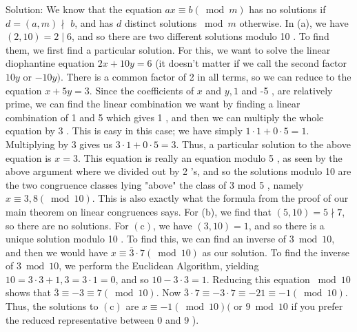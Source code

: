 \begin{enumerate}
  Solution: We know that the equation $a x \equiv b(\bmod m)$ has no solutions if $d=(a, m) \nmid$ $b$, and has $d$ distinct solutions $\bmod m$ otherwise.
  In (a), we have $(2,10)=2 \mid 6$, and so there are two different solutions modulo 10 . To find them, we first find a particular solution. For this, we want to solve the linear diophantine equation $2 x+10 y=6$ (it doesn't matter if we call the second factor $10 y$ or $-10 y)$. There is a common factor of 2 in all terms, so we can reduce to the equation $x+5 y=3$. Since the coefficients of $x$ and $y, 1$ and -5 , are relatively prime, we can find the linear combination we want by finding a linear combination of 1 and 5 which gives 1 , and then we can multiply the whole equation by 3 . This is easy in this case; we have simply $1 \cdot 1+0 \cdot 5=1$. Multiplying by 3 gives us $3 \cdot 1+0 \cdot 5=3$. Thus, a particular solution to the above equation is $x=3$. This equation is really an equation modulo 5 , as seen by the above argument where we divided out by 2 's, and so the solutions modulo 10 are the two congruence classes lying "above" the class of 3 mod 5 , namely $x \equiv 3,8(\bmod 10)$. This is also exactly what the formula from the proof of our main theorem on linear congruences says.
  For (b), we find that $(5,10)=5 \nmid 7$, so there are no solutions.
  For $(\mathrm{c})$, we have $(3,10)=1$, and so there is a unique solution modulo 10 . To find this, we can find an inverse of $3 \bmod 10$, and then we would have $x \equiv \overline{3} \cdot 7(\bmod 10)$ as our solution. To find the inverse of $3 \bmod 10$, we perform the Euclidean Algorithm, yielding $10=3 \cdot 3+1,3=3 \cdot 1=0$, and so $10-3 \cdot 3=1$. Reducing this equation $\bmod 10$ shows that $\overline{3} \equiv-3 \equiv 7(\bmod 10)$. Now $\overline{3} \cdot 7 \equiv-3 \cdot 7 \equiv-21 \equiv-1(\bmod 10)$. Thus, the solutions to $(\mathrm{c})$ are $x \equiv-1(\bmod 10)($ or $9 \bmod 10$ if you prefer the reduced representative between 0 and 9 ).






























\end{enumerate}

